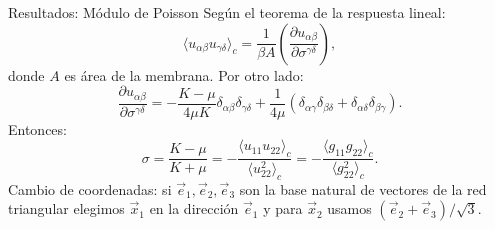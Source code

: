 \documentclass[xcolor=dvipsnames]{beamer}
\begin{document}
\begin{frame}{Resultados: Módulo de Poisson}
Según el teorema de la respuesta lineal:
\begin{equation*}
\langle u_{\alpha\beta}u_{\gamma\delta} \rangle_c
=\frac{1}{\beta A}\left(\frac{\partial u_{\alpha\beta}}{\partial \sigma^{\gamma\delta}}\right),
\end{equation*}
donde $A$ es área de la membrana. Por otro lado:
\begin{equation*}
\frac{\partial u_{\alpha\beta}}{\partial
  \sigma^{\gamma\delta}}=-\frac{K-\mu}{4\mu K}\delta_{\alpha\beta}\delta_{\gamma\delta}+\frac{1}{4\mu}(\delta_{\alpha\gamma}\delta_{\beta\delta}+\delta_{\alpha\delta}\delta_{\beta\gamma}).
\end{equation*}
Entonces:
\begin{equation*}
\sigma=\frac{K-\mu}{K+\mu}=-\frac{\langle u_{11}u_{22}
  \rangle_c}{\langle u_{22}^2 \rangle_c}=-\frac{\langle g_{11}g_{22}
  \rangle_c}{\langle g_{22}^2 \rangle_c}.
\end{equation*}
{\color{fblue} Cambio de coordenadas}: si $\vec{e}_1,\vec{e}_2,\vec{e}_3$ son
la base natural de vectores de la red triangular elegimos
$\vec{x}_1$ en la dirección $\vec{e}_1$ y para $\vec{x}_2$ usamos
$(\vec{e}_2+\vec{e}_3)/\sqrt{3}$.

\end{frame}
\end{document}
